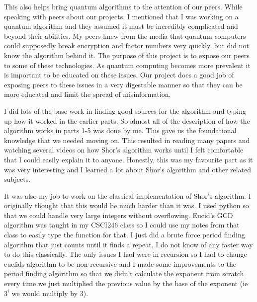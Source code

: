 \documentclass[a4paper]{article}
\begin{document}
This also helps bring quantum algorithms to the attention of our peers. While speaking with peers about our projects,
I mentioned that I was working on a quantum algorithm and they assumed it must be incredibly complicated and beyond their abilities.
My peers knew from the media that quantum computers could supposedly break encryption and factor numbers very quickly,
but did not know the algorithm behind it. The purpose of this project is to expose our peers to some of these technologies.
As quantum computing becomes more prevalent it is important to be educated on these issues.
Our project does a good job of exposing peers to these issues in a very digestable manner so that they can be more educated and limit the spread of  misinformation.

I did lots of the base work in finding good sources for the algorithm and typing up how it worked in the earlier parts.
So almost all of the description of how the algorithm works in parts 1-5 was done by me.
This gave us the foundational knowledge that we needed moving on. This resulted in reading many papers and watching several videos on how Shor's algorithm works until I felt comfortable that I could easily explain it to anyone.
Honestly, this was my favourite part as it was very interesting and I learned a lot about Shor's algorithm and other related subjects.

It was also my job to work on the classical implementation of Shor's algorithm. I originally thought that this would be much harder than it was.
I used python so that we could handle very large integers without overflowing. Eucid's GCD algorithm was taught in my CSCI246 class so I could use my notes from that class to easily type the function for that.
I just did a brute force  period finding algorithm that just counts until it finds a repeat.
I do not know of any faster way to do this classically. The only issues I had were in recursion so I had to change euclids algorithm to be non-recursive and I made some improvements to the period finding algorithm so that we didn't calculate the exponent from scratch every time we just multiplied the previous value by the base of the exponent (ie $3^i$ we would multiply by 3).
\end{document}
